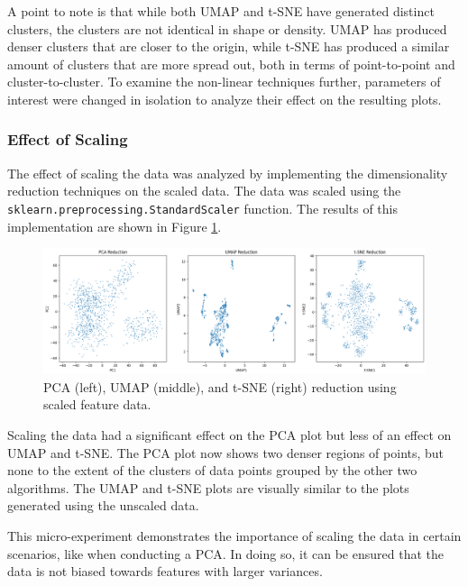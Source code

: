 \documentclass[11pt]{article}
\begin{document}
A point to note is that while both UMAP and t-SNE have generated distinct clusters, the clusters are not identical in shape or density. UMAP has produced denser clusters that are closer to the origin, while t-SNE has produced a similar amount of clusters that are more spread out, both in terms of point-to-point and cluster-to-cluster. To examine the non-linear techniques further, parameters of interest were changed in isolation to analyze their effect on the resulting plots. 

\subsubsection*{Effect of Scaling}
The effect of scaling the data was analyzed by implementing the dimensionality reduction techniques on the scaled data. The data was scaled using the \\ \verb|sklearn.preprocessing.StandardScaler| function. The results of this implementation are shown in Figure \ref{fig:scaled_dimred}.

\begin{figure}[H]
    \centering
    \includegraphics[width=\textwidth]{Images/scaled_dimred.png}
    \caption{PCA (left), UMAP (middle), and t-SNE (right) reduction using scaled feature data.}
    \label{fig:scaled_dimred}
\end{figure}

\vspace{-0.5cm}

Scaling the data had a significant effect on the PCA plot but less of an effect on UMAP and t-SNE. The PCA plot now shows two denser regions of points, but none to the extent of the clusters of data points grouped by the other two algorithms. The UMAP and t-SNE plots are visually similar to the plots generated using the unscaled data.

This micro-experiment demonstrates the importance of scaling the data in certain scenarios, like when conducting a PCA. In doing so, it can be ensured that the data is not biased towards features with larger variances. 
\end{document}
